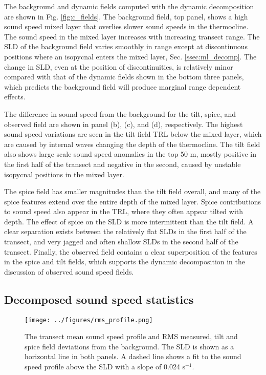 \documentclass[preprint,NumberedRefs]{JASA}
\begin{document}
The background and dynamic fields computed with the dynamic decomposition are shown in Fig. \ref{fig:c_fields}. The background field, top panel, shows a high sound speed mixed layer that overlies slower sound speeds in the thermocline. The sound speed in the mixed layer increases with increasing transect range. The SLD of the background field varies smoothly in range except at discontinuous positions where an isopycnal enters the mixed layer, Sec. \ref{ssec:ml_decomp}. The change in SLD, even at the position of discontinuities, is relatively minor compared with that of the dynamic fields shown in the bottom three panels, which predicts the background field will produce marginal range dependent effects.

The difference in sound speed from the background for the tilt, spice, and observed field are shown in panel (b), (c), and (d), respectively. The highest sound speed variations are seen in the tilt field TRL below the mixed layer, which are caused by internal waves changing the depth of the thermocline\cite{colosi21}. The tilt field also shows large scale sound speed anomalies in the top 50 m, mostly positive in the first half of the transect and negative in the second, caused by unstable isopycnal positions in the mixed layer.

The spice field has smaller magnitudes than the tilt field overall, and many of the spice features extend over the entire depth of the mixed layer. Spice contributions to sound speed also appear in the TRL, where they often appear tilted with depth. The effect of spice on the SLD is more intermittent than the tilt field. A clear separation exists between the relatively flat SLDs in the first half of the transect, and very jagged and often shallow SLDs in the second half of the transect. Finally, the observed field contains a clear superposition of the features in the spice and tilt fields, which supports the dynamic decomposition in the discussion of observed sound speed fields.

\subsection{Decomposed sound speed statistics}
\begin{figure}
\texttt{[image: ../figures/rms\_profile.png]}
        \caption{\label{fig:c_rms}{The transect mean sound speed profile and RMS measured, tilt and spice field deviations from the background. The SLD is shown as a horizontal line in both panels. A dashed line shows a fit to the sound speed profile above the SLD with a slope of 0.024 s$^{-1}$.}}
\end{figure}
\end{document}
